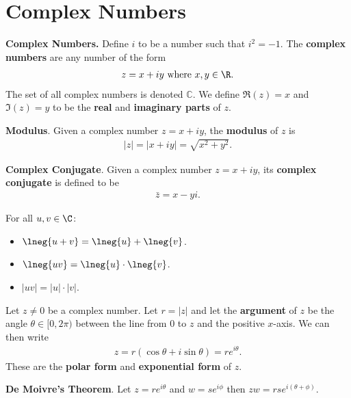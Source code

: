 \documentclass{article}
\begin{document}
\section{Complex Numbers}
\begin{definition}
    \textbf{Complex Numbers.} Define $i$ to be a number such that $i^2 = -1$. 
    The \textbf{complex numbers} are any number of the form
    \begin{align*}
        z = x+iy \text{ where } x,y\in\R.
    \end{align*}
    The set of all complex numbers is denoted $\mathbb{C}$. We define $\Re(z) = x$ and $\Im(z)=y$ to be the \textbf{real} and \textbf{imaginary parts} of $z$.
\end{definition}
\begin{definition}
    \textbf{Modulus}. Given a complex number $z=x+iy$, the \textbf{modulus} of $z$ is
    \begin{align*}
        |z|=|x+iy|=\sqrt{x^2+y^2}.
    \end{align*}
\end{definition}
\begin{definition}
    \textbf{Complex Conjugate}. Given a complex number $z=x+iy$, its \textbf{complex conjugate} is defined to be
    \begin{align*}
        \bar{z}=x-yi.
    \end{align*}
\end{definition}
\begin{theorem}
    For all $u,v\in\C$:
    \begin{itemize}
        \item $\lneg{u+v}=\lneg{u}+\lneg{v}$.
        \item $\lneg{uv}=\lneg{u}\cdot\lneg{v}$.
        \item $|uv|=|u|\cdot|v|$.
    \end{itemize}
\end{theorem}
\begin{definition}
    Let $z\not=0$ be a complex number. 
    Let $r=|z|$ and let the \textbf{argument} of $z$ be the angle $\theta\in[0,2\pi)$ between the line from $0$ to $z$ and the positive $x$-axis. We can then write
    \begin{align*}
        z = r(\cos\theta+i\sin\theta)=re^{i\theta}.
    \end{align*}
    These are the \textbf{polar form} and \textbf{exponential form} of $z$.
\end{definition}
\begin{theorem}
    \textbf{De Moivre's Theorem}. Let $z=re^{i\theta}$ and $w=se^{i\phi}$ then $zw=rse^{i(\theta+\phi)}$.
\end{theorem}
\end{document}
